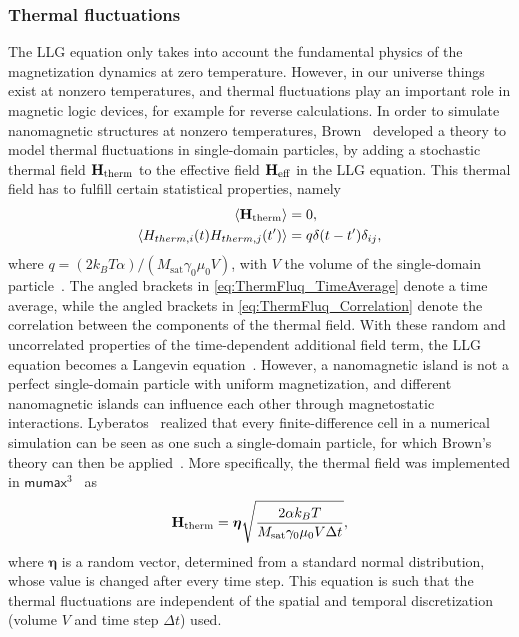 \documentclass[11pt,a4paper,english]{article}
\renewcommand{\vec}[1]{\boldsymbol{#1}}
\newcommand{\mumax}{$\mathsf{mumax}^3$}
\begin{document}
\subsubsection{Thermal fluctuations}
The LLG equation only takes into account the fundamental physics of the magnetization dynamics at zero temperature. However, in our universe things exist at nonzero temperatures, and thermal fluctuations play an important role in magnetic logic devices, for example for reverse calculations. In order to simulate nanomagnetic structures at nonzero temperatures, Brown~\cite{ThermFluc_SingleDomain} developed a theory to model thermal fluctuations in single-domain particles, by adding a stochastic thermal field $\vb{H_\mathrm{therm}}$ to the effective field $\vb{H_\mathrm{eff}}$ in the LLG equation. This thermal field has to fulfill certain statistical properties, namely
\begin{align}
    \langle \vb{H_\mathrm{therm}} \rangle &= 0 \mathrm{,} \label{eq:ThermFluq_TimeAverage} \\
    \langle H_{therm,i}(t) H_{therm,j}(t') \rangle &= q \delta(t-t') \delta_{ij} \mathrm{,} \label{eq:ThermFluq_Correlation}
\end{align}
where $q=(2 k_B T \alpha)/(M_\mathrm{sat} \gamma_0 \mu_0 V)$, with $V$ the volume of the single-domain particle~\cite{phd_leliaert}. The angled brackets in \cref{eq:ThermFluq_TimeAverage} denote a time average, while the angled brackets in \cref{eq:ThermFluq_Correlation} denote the correlation between the components of the thermal field. With these random and uncorrelated properties of the time-dependent additional field term, the LLG equation becomes a Langevin equation~\cite{ThermFluc_SingleDomain}. However, a nanomagnetic island is not a perfect single-domain particle with uniform magnetization, and different nanomagnetic islands can influence each other through magnetostatic interactions.
Lyberatos~\cite{Lyberatos_1993} realized that every finite-difference cell in a numerical simulation can be seen as one such a single-domain particle, for which Brown's theory can then be applied~\cite{phd_leliaert}. More specifically, the thermal field was implemented in \mumax{}~\cite{LEL-17b,MuMax3} as
\begin{equation}
    \vb{H_\mathrm{therm}} = \vec{\eta} \sqrt{\frac{2 \alpha k_B T}{M_\mathrm{sat} \gamma_0 \mu_0 V \Delta t}} \mathrm{,}
    \label{eq:H_therm}
\end{equation}
where $\vec{\eta}$ is a random vector, determined from a standard normal distribution, whose value is changed after every time step. This equation is such that the thermal fluctuations are independent of the spatial and temporal discretization (volume $V$ and time step $\Delta t$) used.
\end{document}
